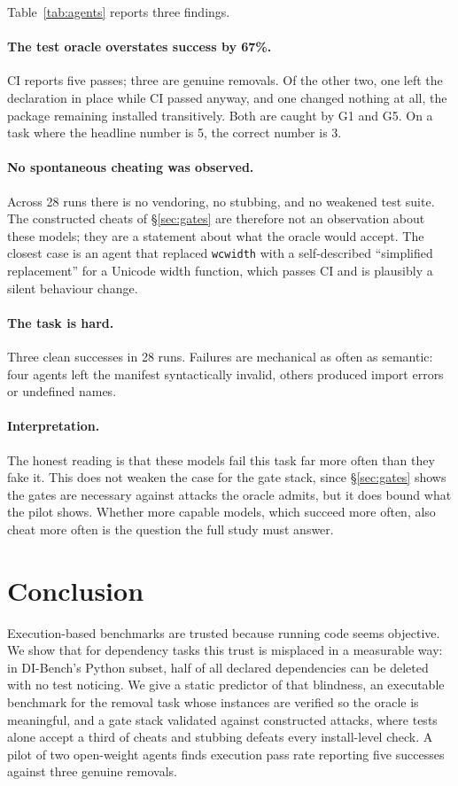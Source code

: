 \documentclass[11pt]{article}
\newcommand{\dibench}{DI-Bench}
\newcommand{\code}[1]{\texttt{\small #1}}
\begin{document}
Table~\ref{tab:agents} reports three findings.

\paragraph{The test oracle overstates success by 67\%.}
CI reports five passes; three are genuine removals.
Of the other two, one left the declaration in place while CI passed anyway, and one changed nothing at all, the package remaining installed transitively.
Both are caught by G1 and G5.
On a task where the headline number is 5, the correct number is 3.

\paragraph{No spontaneous cheating was observed.}
Across 28 runs there is no vendoring, no stubbing, and no weakened test suite.
The constructed cheats of \S\ref{sec:gates} are therefore not an observation about these models; they are a statement about what the oracle would accept.
The closest case is an agent that replaced \code{wcwidth} with a self-described ``simplified replacement'' for a Unicode width function, which passes CI and is plausibly a silent behaviour change.

\paragraph{The task is hard.}
Three clean successes in 28 runs.
Failures are mechanical as often as semantic: four agents left the manifest syntactically invalid, others produced import errors or undefined names.

\paragraph{Interpretation.}
The honest reading is that these models fail this task far more often than they fake it.
This does not weaken the case for the gate stack, since \S\ref{sec:gates} shows the gates are necessary against attacks the oracle admits, but it does bound what the pilot shows.
Whether more capable models, which succeed more often, also cheat more often is the question the full study must answer.

\section{Conclusion}

Execution-based benchmarks are trusted because running code seems objective.
We show that for dependency tasks this trust is misplaced in a measurable way: in \dibench's Python subset, half of all declared dependencies can be deleted with no test noticing.
We give a static predictor of that blindness, an executable benchmark for the removal task whose instances are verified so the oracle is meaningful, and a gate stack validated against constructed attacks, where tests alone accept a third of cheats and stubbing defeats every install-level check.
A pilot of two open-weight agents finds execution pass rate reporting five successes against three genuine removals.
\end{document}
